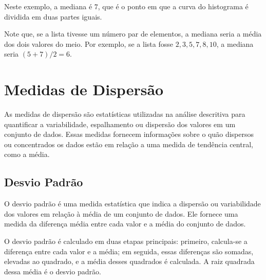 \begin{center}
\end{center}
    
    

Neste exemplo, a mediana é $7$, que é o ponto em que a curva do histograma é dividida em duas partes iguais.

Note que, se a lista tivesse um número par de elementos, a mediana seria a média dos dois valores do meio. Por exemplo, se a lista fosse $2, 3, 5, 7, 8, 10$, a mediana seria $(5+7)/2 = 6$.

\section{Medidas de Dispersão}

As medidas de dispersão são estatísticas utilizadas na análise descritiva para quantificar a variabilidade, espalhamento ou dispersão dos valores em um conjunto de dados. Essas medidas fornecem informações sobre o quão dispersos ou concentrados os dados estão em relação a uma medida de tendência central, como a média.

\subsection{Desvio Padrão}

O desvio padrão é uma medida estatística que indica a dispersão ou variabilidade dos valores em relação à média de um conjunto de dados. Ele fornece uma medida da diferença média entre cada valor e a média do conjunto de dados.

O desvio padrão é calculado em duas etapas principais: primeiro, calcula-se a diferença entre cada valor e a média; em seguida, essas diferenças são somadas, elevadas ao quadrado, e a média desses quadrados é calculada. A raiz quadrada dessa média é o desvio padrão.

